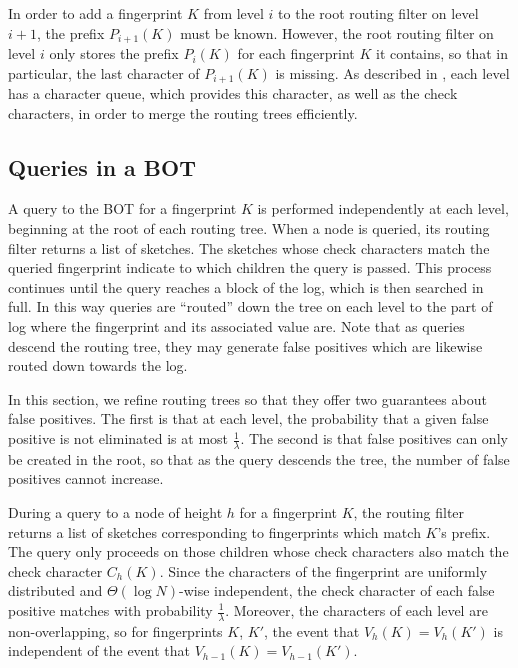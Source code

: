 In order to add a fingerprint $K$ from level $i$ to the root routing filter on
level $i+1$, the prefix $P_{i+1}(K)$ must be known. However, the root routing
filter on level $i$ only stores the prefix $P_i(K)$ for each fingerprint $K$ it
contains, so that in particular, the last character of $P_{i+1}(K)$ is missing.
As described in , each level has a character queue,
which provides this character, as well as the check characters, in order to
merge the routing trees efficiently.

\subsection{Queries in a BOT}\label{sec:routing-tree-query}

A query to the BOT for a fingerprint $K$ is performed independently at each
level, beginning at the root of each routing tree. When a node is queried, its
routing filter returns a list of sketches. The sketches whose check characters
match the queried fingerprint indicate to which children the query is passed.
This process continues until the query reaches a block of the log, which is
then searched in full. In this way queries are ``routed'' down the tree on each
level to the part of log where the fingerprint and its associated value are.
Note that as queries descend the routing tree, they may generate false
positives which are likewise routed down towards the log.

In this section, we refine routing trees so that they offer two guarantees
about false positives. The first is that at each level, the probability that a
given false positive is not eliminated is at most $\frac{1}{\lambda}$. The
second is that false positives can only be created in the root, so that as the
query descends the tree, the number of false positives cannot increase.

During a query to a node of height $h$ for a fingerprint $K$, the routing
filter returns a list of sketches corresponding to fingerprints which match
$K$'s prefix. The query only proceeds on those children whose check characters
also match the check character $C_h(K)$. Since the characters of the
fingerprint are uniformly distributed and $\Theta(\log N)$-wise independent,
the check character of each false positive matches with probability
$\frac{1}{\lambda}$.  Moreover, the characters of each level are
non-overlapping, so for fingerprints $K$, $K'$, the event that $V_h(K)=V_h(K')$
is independent of the event that $V_{h-1}(K)=V_{h-1}(K')$.

